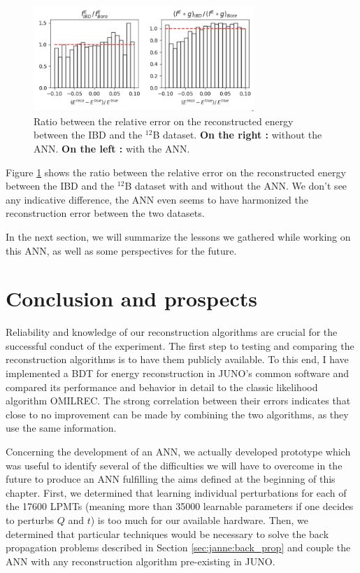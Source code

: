 \documentclass[../main.tex]{subfiles}
\begin{document}
\begin{figure}[!ht]
  \centering
  \includegraphics[height=4cm]{images/janne/ann_effect_400.png}
  \caption{Ratio between the relative error on the reconstructed energy between the IBD and the $^{12}$B dataset. \textbf{On the right :} without the ANN. \textbf{On the left :} with the ANN.}
  \label{fig:janne:ann_effect_400}
\end{figure}

Figure \ref{fig:janne:ann_effect_400} shows the ratio between the relative error on the reconstructed energy between the IBD and the $^{12}$B dataset with and without the ANN. We don't see any indicative difference, the ANN even seems to have harmonized the reconstruction error between the two datasets.

In the next section, we will summarize the lessons we gathered while working on this ANN, as well as some perspectives for the future.

\section{Conclusion and prospects}
\label{sec:janne:conclusion}

Reliability and knowledge of our reconstruction algorithms are crucial for the successful conduct of the experiment. The first step to testing and comparing the reconstruction algorithms is to have them publicly available. To this end, I have implemented a BDT for energy reconstruction in JUNO's common software and compared its performance and behavior in detail to the classic likelihood algorithm OMILREC. The strong correlation between their errors indicates that close to no improvement can be made by combining the two algorithms, as they use the same information.

\hfill

Concerning the development of an ANN, we actually developed prototype which was useful to identify several of the difficulties we will have to overcome in the future to produce an ANN fulfilling the aims defined at the beginning of this chapter. First, we determined that learning individual perturbations for each of the 17600 LPMTs (meaning more than 35000 learnable parameters
if one decides to perturbs $Q$ and $t$) is too much for our available hardware. Then, we determined that particular techniques would be necessary to solve the back propagation problems
described in Section \ref{sec:janne:back_prop} and couple the ANN with any reconstruction algorithm pre-existing in JUNO.
\end{document}
